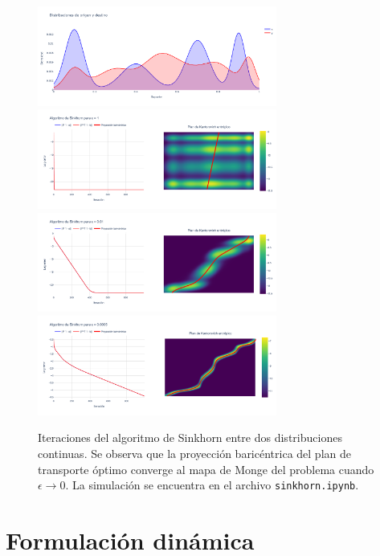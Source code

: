 \begin{figure}[!ht]
	\centering
	\includegraphics[width=0.7\textwidth]{images/eot_sbp/continuous_sinkhorn_density}
	\includegraphics[width=0.7\textwidth]{images/eot_sbp/continuous_sinkhorn_matrix1}
	\includegraphics[width=0.7\textwidth]{images/eot_sbp/continuous_sinkhorn_matrix0.01}
	\includegraphics[width=0.7\textwidth]{images/eot_sbp/continuous_sinkhorn_matrix0.0005}
	\caption{Iteraciones del algoritmo de Sinkhorn entre dos distribuciones continuas. Se observa que la proyección baricéntrica del plan de transporte óptimo converge al mapa de Monge del problema cuando $\epsilon\to0$. La simulación se encuentra en el archivo \texttt{sinkhorn.ipynb}.}
	\label{fig:eot_sbp/discrete_sinkhorn_matrix1}
\end{figure}

\section{Formulación dinámica}
\label{eot_sbp/dynamic}

